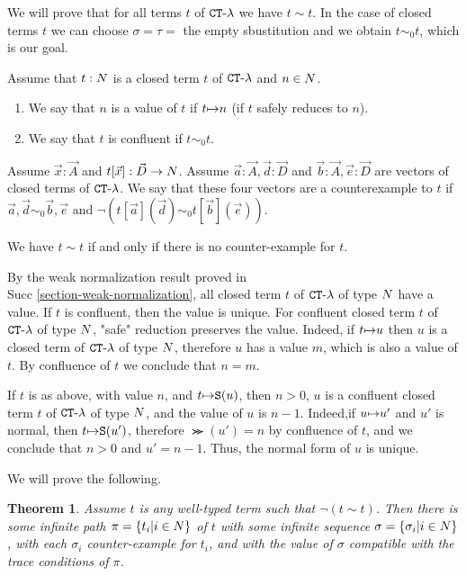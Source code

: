 \documentclass{article}
\newtheorem{theorem}{Theorem}[section]
\begin{document}
We will prove that  for all terms $t$ of ${ {\tt CT} \mbox{-} \lambda}$ we have $t \sim t$. In the case of closed terms $t$
we can choose $\sigma=\tau=$ the empty sbustitution and we obtain $t \sim_0 t$, which is our goal.

Assume that $t:{N}$ is a closed term $t$ of ${ {\tt CT} \mbox{-} \lambda}$ and $n \in {N}$. 
\begin{enumerate}
\item
We say that $n$ is a value of $t$ if $t {\mapsto} n$ (if $t$ safely reduces to $n$). 
\item
We say that $t$ is confluent if $t \sim_0 t$.
\end{enumerate}
Assume $\vec{x}:\vec{A}$ and $t[\vec{x}]: \vec{D} \rightarrow {N}$. Assume 
$\vec{a}:\vec{A},\vec{d}:\vec{D}$ 
and $\vec{b}:\vec{A},\vec{e}:\vec{D}$ are vectors of closed terms of ${ {\tt CT} \mbox{-} \lambda}$. We say that 
these four vectors are a counterexample to $t$ if $\vec{a},\vec{d} \sim_0 \vec{b},\vec{e}$
and $\neg (t[\vec{a}](\vec{d}) \sim_0  t[\vec{b}](\vec{e}))$.

We have $t \sim t$ if and only if there is no counter-example for $t$.


By the weak normalization result proved in \\Succ  \ref{section-weak-normalization}, all 
closed term $t$ of ${ {\tt CT} \mbox{-} \lambda}$ of type ${N}$ have a value. If $t$ is confluent, then the value is unique.
For confluent closed term $t$ of ${ {\tt CT} \mbox{-} \lambda}$ of type ${N}$, "safe" reduction preserves the value. Indeed,
if $t {\mapsto} u$ then $u$ is a closed term of ${ {\tt CT} \mbox{-} \lambda}$ of type ${N}$, therefore $u$ has a value
$m$, which is also a value of $t$. By confluence of $t$ we conclude that $n=m$.

If $t$ is as above, with value $n$, and $t {\mapsto} {\tt S} (u)$, then $n>0$, 
$u$ is a confluent closed term $t$ of ${ {\tt CT} \mbox{-} \lambda}$ of type ${N}$, and the value of $u$ is $n-1$.
Indeed,if $u {\mapsto} u'$ and $u'$ is normal, then $t {\mapsto} {\tt S} (u')$, therefore $\Succ (u')=n$ 
by confluence of $t$, and we conclude that $n>0$ and $u'=n-1$. Thus, the normal form of $u$ is unique.

We will prove the following.

\begin{theorem}
Assume $t$ is any well-typed term such that $\neg (t \sim t)$. Then there is some infinite path 
$\pi=\{t_i | i \in {N}\}$ of $t$ with some infinite sequence $\sigma= \{\sigma_i| i \in {N}\}$, with
each $\sigma_i$ counter-example for $t_i$, and with the value of $\sigma$ compatible with the
trace conditions of $\pi$.
\end{theorem}
\end{document}
